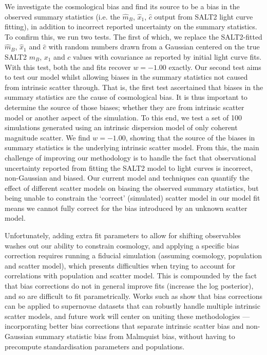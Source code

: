 \documentclass[a4paper,fleqn,usenatbib,manuscript]{emulateapj}
\newcommand{\blue}{\color{blue}}
\newcommand{\gten}{\citetalias{Guy2010}}
\newcommand{\celeven}{\citetalias{Chotard2011}}
\begin{document}
We investigate the cosmological bias and find its source to be a bias in the observed summary statistics (i.e. the $\hat{m}_B$, $\hat{x}_1$, $\hat{c}$ output from SALT2 light curve fitting), in addition to incorrect reported uncertainty on the summary statistics. To confirm this, we run two tests. The first of which, we replace the SALT2-fitted $\hat{m}_B$, $\hat{x}_1$ and $\hat{c}$ with random numbers drawn from a Gaussian centered on the true SALT2 $m_B$, $x_1$ and $c$ values with covariance as reported by initial light curve fits. With this test, both the {\gten} and {\celeven} fits recover $w=-1.00$ exactly. Our second test aims to test our model whilst allowing biases in the summary statistics not caused from intrinsic scatter through. {\blue That is, the first test ascertained that biases in the summary statistics are the cause of cosmological bias. It is thus important to determine the source of those biases; whether they are from intrinsic scatter model or another aspect of the simulation. To} this end, we test a set of 100 simulations generated using an intrinsic dispersion model of only coherent magnitude scatter. {\blue We find $w=-1.00$, showing} that the source of the biases in summary statistics is the underlying intrinsic scatter model. From this, the main challenge of improving our methodology is to handle the fact that observational uncertainty reported from fitting the SALT2 model to light curves is incorrect, non-Gaussian and biased. Our current model and techniques can quantify the effect of different scatter models on biasing the observed summary statistics, but being unable to constrain the `correct' (simulated) scatter model in our model fit means we cannot fully correct for the bias introduced by an unknown scatter model. 

Unfortunately, adding extra fit parameters to allow for shifting observables washes out our ability to constrain cosmology, and applying a specific bias correction requires running a fiducial simulation (assuming cosmology, population and scatter model), which presents difficulties when trying to account for correlations with population and scatter model. This is compounded by the fact that bias corrections do not in general improve fits (increase the log posterior), and so are difficult to fit parametrically. Works such as \citet{Kessler2017} show that bias corrections can be applied to supernovae datasets that can robustly handle multiple intrinsic scatter models, and future work will center on uniting these methodologies --- incorporating better bias corrections that separate intrinsic scatter bias and non-Gaussian summary statistic bias from Malmquist bias, without having to precompute standardisation parameters and populations.
\end{document}
